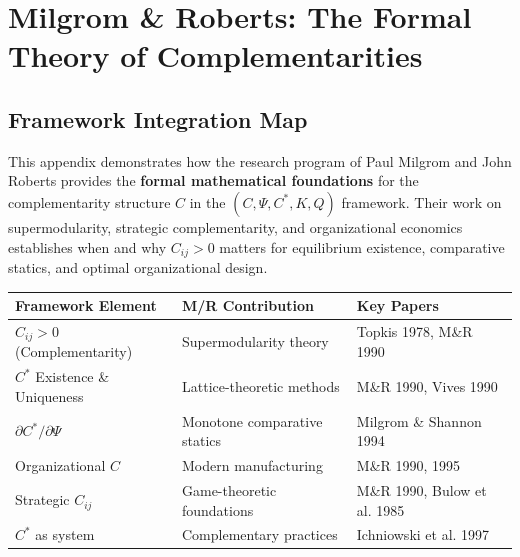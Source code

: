 \section{Milgrom \& Roberts: The Formal Theory of Complementarities}
\label{app:milgrom-roberts}

\subsection{Framework Integration Map}

This appendix demonstrates how the research program of Paul Milgrom and John Roberts 
provides the \textbf{formal mathematical foundations} for the complementarity structure 
$C$ in the $(C, \Psi, C^*, K, Q)$ framework. Their work on supermodularity, strategic 
complementarity, and organizational economics establishes when and why $C_{ij} > 0$ 
matters for equilibrium existence, comparative statics, and optimal organizational design.

\begin{center}
\renewcommand{\arraystretch}{1.4}
\begin{tabular}{|l|l|l|}
\hline
\textbf{Framework Element} & \textbf{M/R Contribution} & \textbf{Key Papers} \\
\hline
$C_{ij} > 0$ (Complementarity) & Supermodularity theory & Topkis 1978, M\&R 1990 \\
$C^*$ Existence \& Uniqueness & Lattice-theoretic methods & M\&R 1990, Vives 1990 \\
$\partial C^* / \partial \Psi$ & Monotone comparative statics & Milgrom \& Shannon 1994 \\
Organizational $C$ & Modern manufacturing & M\&R 1990, 1995 \\
Strategic $C_{ij}$ & Game-theoretic foundations & M\&R 1990, Bulow et al. 1985 \\
$C^*$ as system & Complementary practices & Ichniowski et al. 1997 \\
\hline
\end{tabular}
\end{center}

